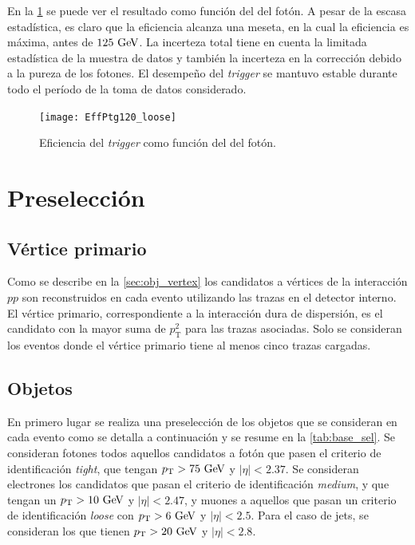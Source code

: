 En la \cref{fig:trigger_perf} se puede ver el resultado como función del {\pt}
del fotón.
A pesar de la escasa estadística, es claro que la eficiencia alcanza una meseta,
en la cual la eficiencia es máxima, antes de $125 \gev$. La incerteza total
tiene en cuenta la limitada estadística de la muestra de datos y también la
incerteza en la corrección debido a la pureza de los fotones. El desempeño del
\emph{trigger} se mantuvo estable durante todo el período de la toma de datos
considerado.

\begin{figure}[!htb]
  \centering

  \texttt{[image: EffPtg120\_loose]}

  \caption{Eficiencia del \emph{trigger} {\trigchain} como función del {\pt} del fotón.}
  \label{fig:trigger_perf}
\end{figure}


\section{Preselección}
\label{sec:base_seleccion}

\subsection{Vértice primario}

Como se describe en la \cref{sec:obj_vertex} los candidatos a vértices de la interacción $pp$ son
reconstruidos en cada evento utilizando las trazas en el detector interno. El
vértice primario, correspondiente a la interacción dura de dispersión, es el
candidato con la mayor suma de $p_{\mathrm{T}}^{2}$ para las trazas asociadas. Solo se
consideran los eventos donde el vértice primario tiene al menos cinco trazas
cargadas.


\subsection{Objetos}
\label{sec:preselection}

En primero lugar se realiza una preselección de los objetos que se consideran en cada
evento como se detalla a continuación y se resume en la \cref{tab:base_sel}. Se
consideran fotones todos aquellos candidatos a fotón que pasen el criterio de
identificación \emph{tight}, que tengan $\pt>75\gev$ y $|\eta|<2.37$. Se
consideran electrones los candidatos que pasan el criterio de identificación \emph{medium}, y
que tengan un $\pt>10\gev$ y $|\eta|<2.47$, y muones a aquellos que pasan un criterio de
identificación \emph{loose} con $\pt>6 \gev$ y $|\eta|<2.5$. Para el caso de
jets, se consideran los que tienen $\pt>20\gev$ y $|\eta|<2.8$.


